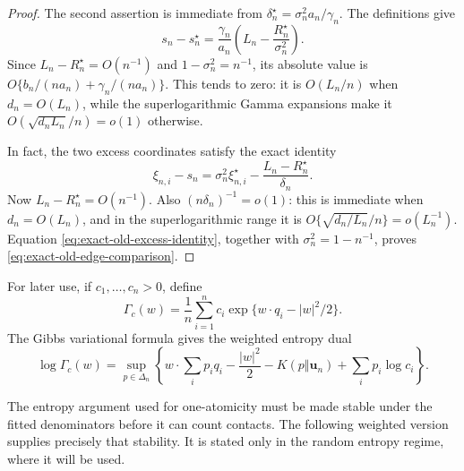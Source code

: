 \begin{proof}
The second assertion is immediate from
\(\delta_n^\star=\sigma_n^2a_n/\gamma_n\).  The definitions give
\[
 s_n-s_n^\star
 =\frac{\gamma_n}{a_n}
   \left(L_n-\frac{R_n^\star}{\sigma_n^2}\right).
\]
Since \(L_n-R_n^\star=O(n^{-1})\) and
\(1-\sigma_n^2=n^{-1}\), its absolute value is
\(O\{b_n/(na_n)+\gamma_n/(na_n)\}\).  This tends to zero: it is
\(O(L_n/n)\) when \(d_n=O(L_n)\), while the superlogarithmic Gamma
expansions make it \(O(\sqrt{d_nL_n}/n)=o(1)\) otherwise.

In fact, the two excess coordinates satisfy the exact identity
\begin{equation}
\label{eq:exact-old-excess-identity}
 \xi_{n,i}-s_n
 =\sigma_n^2\xi_{n,i}^\star
  -\frac{L_n-R_n^\star}{\delta_n}.
\end{equation}
Now \(L_n-R_n^\star=O(n^{-1})\).  Also
\((n\delta_n)^{-1}=o(1)\): this is immediate when \(d_n=O(L_n)\), and in
the superlogarithmic range it is
\(O\{\sqrt{d_n/L_n}/n\}=o(L_n^{-1})\).
Equation \eqref{eq:exact-old-excess-identity}, together with
\(\sigma_n^2=1-n^{-1}\), proves
\eqref{eq:exact-old-edge-comparison}.
\end{proof}


For later use, if \(c_1,\ldots,c_n>0\), define
\[
 \Gamma_c(w)=\frac1n\sum_{i=1}^n
 c_i\exp\{w\cdot q_i-|w|^2/2\}.
\]
The Gibbs variational formula gives the weighted entropy dual
\begin{equation}
\label{eq:weighted-entropy-dual}
 \log\Gamma_c(w)
 =\sup_{p\in\Delta_n}
 \left\{
  w\cdot\sum_ip_iq_i-\frac{|w|^2}{2}
  -K(p\Vert\mathbf u_n)+\sum_ip_i\log c_i
 \right\}.
\end{equation}

The entropy argument used for one-atomicity must be made stable under the
fitted denominators before it can count contacts.  The following weighted
version supplies precisely that stability.  It is stated only in the random
entropy regime, where it will be used.

